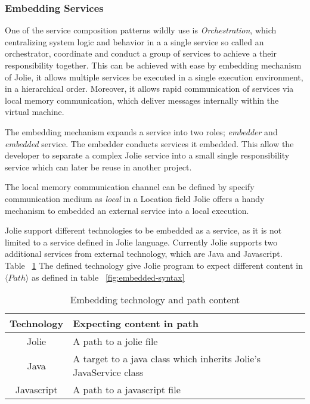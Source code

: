 \subsubsection{Embedding Services}
\label{sec:embedded}
One of the service composition patterns wildly use is \textit{Orchestration}, which centralizing system logic and behavior in a a single service so called an orchestrator, coordinate and conduct a group of services to achieve a their responsibility together. This can be achieved with ease by embedding mechanism of Jolie, it allows multiple services be executed in a single execution environment, in a hierarchical order.
Moreover, it allows rapid communication of services via local memory communication, which deliver messages internally within the virtual machine.

The embedding mechanism expands a service into two roles; \textit{embedder} and \textit{embedded} service. The embedder conducts services it embedded. This allow the developer to separate a complex Jolie service into a small single responsibility service which can later be reuse in another project. 

The local memory communication channel can be defined by specify communication medium as \textit{local} in a Location field
Jolie offers a handy mechanism to embedded an external service into a local execution. 

Jolie support different technologies to be embedded as a service, as it is not limited to a service defined in Jolie language. Currently Jolie supports two additional services from external technology, which are Java and Javascript. Table ~\ref{table:embedded-technology-path} The defined technology give Jolie program to expect different content in \(\langle Path \rangle\) as defined in table ~\ref{fig:embedded-syntax}

\begin{table}[h]
    \centering
    \begin{tabular}{ |c|l| }
        \hline
        Technology & Expecting content in path                                         \\
        \hline
        Jolie      & A path to a jolie file                                            \\
        Java       & A target to a java class which inherits Jolie's JavaService class \\
        Javascript & A path to a javascript file                                       \\
        \hline
    \end{tabular}
    \caption{Embedding technology and path content}
    \label{table:embedded-technology-path}
\end{table}



